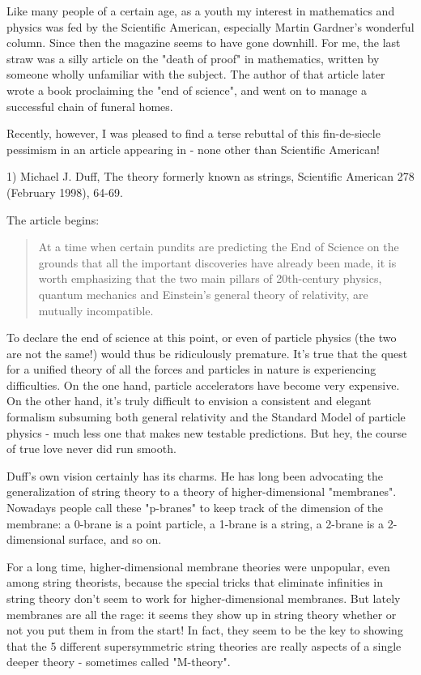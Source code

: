 

Like many people of a certain age, as a youth my interest in mathematics
and physics was fed by the Scientific American, especially Martin
Gardner's wonderful column.  Since then the magazine seems to have gone
downhill.  For me, the last straw was a silly article on the "death of
proof" in mathematics, written by someone wholly unfamiliar with the
subject.  The author of that article later wrote a book proclaiming the
"end of science", and went on to manage a successful chain of funeral
homes.

Recently, however, I was pleased to find a terse rebuttal of this
fin-de-siecle pessimism in an article appearing in - none other than
Scientific American!

1) Michael J. Duff, The theory formerly known as strings, Scientific
American 278 (February 1998), 64-69.  

The article begins:

\begin{quote}
    At a time when certain pundits are predicting the End of Science
    on the grounds that all the important discoveries have already
    been made, it is worth emphasizing that the two main pillars of
    20th-century physics, quantum mechanics and Einstein's general 
    theory of relativity, are mutually incompatible.  
\end{quote}
To declare the end of science at this point, or even of particle physics
(the two are not the same!) would thus be ridiculously
premature.  It's true that the quest for a unified theory of all the
forces and particles in nature is experiencing difficulties.  On the one
hand, particle accelerators have become very expensive.  On the other
hand, it's truly difficult to envision a consistent and elegant
formalism subsuming both general relativity and the Standard Model
of particle physics - much less one that makes new testable predictions.
But hey, the course of true love never did run smooth.

Duff's own vision certainly has its charms.  He has long been advocating
the generalization of string theory to a theory of higher-dimensional
"membranes".  Nowadays people call these "p-branes" to keep track of the
dimension of the membrane: a 0-brane is a point particle, a 1-brane is a
string, a 2-brane is a 2-dimensional surface, and so on.

For a long time, higher-dimensional membrane theories were unpopular,
even among string theorists, because the special tricks that eliminate
infinities in string theory don't seem to work for higher-dimensional
membranes.  But lately membranes are all the rage: it seems they show up
in string theory whether or not you put them in from the start!  In
fact, they seem to be the key to showing that the 5 different
supersymmetric string theories are really aspects of a single deeper
theory - sometimes called "M-theory".

